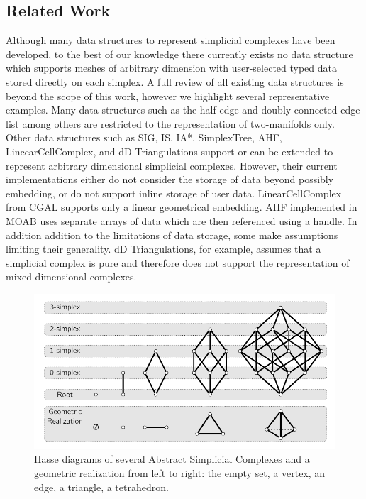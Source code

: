 \subsection{Related Work}
\par Although many data structures to represent simplicial complexes have been developed, to the best of our knowledge there currently exists no data structure which supports meshes of arbitrary dimension with user-selected typed data stored directly on each simplex.
A full review of all existing data structures is beyond the scope of this work,
however we highlight several representative examples.
Many data structures such as the half-edge and doubly-connected edge list among others are restricted to the representation of two-manifolds only\cite{DeFloriani2005}.
Other data structures such as SIG\cite{DeFloriani2004}, IS\cite{DeFloriani2010b}, IA*\cite{Canino2011}, SimplexTree\cite{Boissonnat2012}, AHF\cite{Dyedov2015,Ray2015}, LincearCellComplex, and dD Triangulations\cite{boissonnat:inria-00412437} support or can be extended to represent arbitrary dimensional simplicial complexes.
However, their current implementations either do not consider the storage of data beyond possibly embedding, or do not support inline storage of user data.
LinearCellComplex from CGAL supports only a linear geometrical embedding\cite{CGAL}.
AHF implemented in MOAB uses separate arrays of data which are then referenced using a handle\cite{Dyedov2015,Ray2015}.
In addition addition to the limitations of data storage, some make assumptions limiting their generality.
dD Triangulations, for example, assumes that a simplicial complex is pure and therefore does not support the representation of mixed dimensional complexes\cite{boissonnat:inria-00412437}.

\begin{figure}[ht!]
	\centering
	\includegraphics[width=\textwidth]{Figures/hasse/hasse}
	\caption[Hasse diagram representation of Abstract Simplicial Complexes]{Hasse diagrams of several Abstract Simplicial Complexes and a geometric realization from left to right: the empty set, a vertex, an edge, a triangle, a tetrahedron.}
	\label{fig:hasse}
\end{figure}

